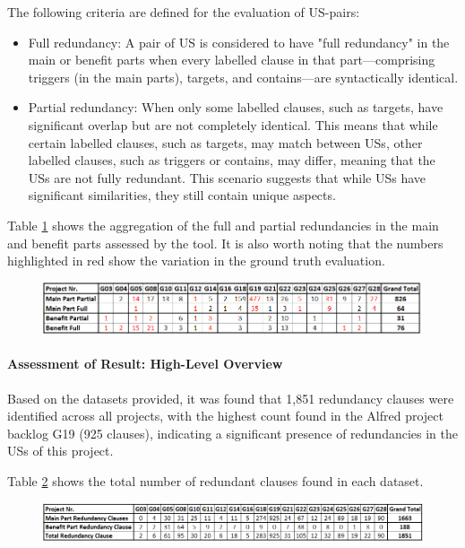 The following criteria are defined for the evaluation of US-pairs:
\begin{itemize}
	\item Full redundancy: 	A pair of US is considered to have "full redundancy" in the main or benefit parts when every labelled clause in that part—comprising triggers (in the main parts), targets, and contains—are syntactically identical.
	
	\item Partial redundancy: When only some labelled clauses, such as targets, have significant overlap but are not completely identical. This means that while certain labelled clauses, such as targets, may match between USs, other labelled clauses, such as triggers or contains, may differ, meaning that the USs are not fully redundant. This scenario suggests that while USs have significant similarities, they still contain unique aspects.
\end{itemize}
Table \ref{tb:tool} shows the aggregation of the full and partial redundancies in the main and benefit parts assessed by the tool. It is also worth noting that the numbers highlighted in red show the variation in the ground truth evaluation.
\begin{figure}[h]
	\begingroup
	\scriptsize
	\centering
	\includegraphics[scale=0.6]{Table/tool.png}
	\label{tb:tool}
	\endgroup
\end{figure}
\paragraph{Assessment of Result: High-Level Overview}Based on the datasets provided, it was found that 1,851 redundancy clauses were identified across all projects, with the highest count found in the Alfred project backlog G19 (925 clauses), indicating a significant presence of redundancies in the USs of this project.

Table \ref{tb:redundancy_clauses} shows the total number of redundant clauses found in each dataset.
\begin{figure}[h]
	\begingroup
	\scriptsize
	\centering
	\includegraphics[scale=0.55]{Table/redundancy_clauses.png}
	\label{tb:redundancy_clauses}
	
	\endgroup
\end{figure}
